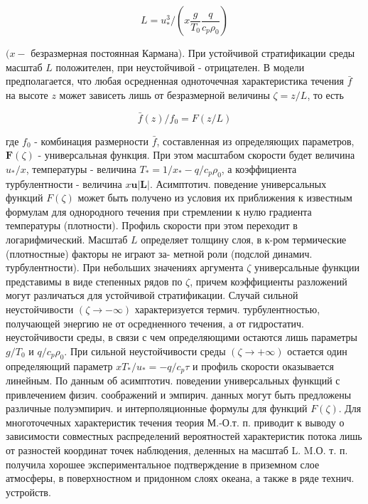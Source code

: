 \documentclass[10pt]{article}
\begin{document}
\[

L=u_{*}^{3} /\left(x \frac{g}{T_{0}} \frac{q}{c_{p} \rho_{0}}\right)

\]



$(x-$ безразмерная постоянная Кармана). При устойчивой стратификации среды масштаб $L$ положителен, при неустойчивой - отрицателен. В модели предполагается, что любая осредненная одноточечная характеристика течения $\bar{f}$ на высоте $z$ может зависеть лишь от безразмерной величины $\zeta=z / L$, то есть



\[

\bar{f}(z) / f_{0}=F(z / L)

\]



где $f_{0}$ - комбинация размерности $\bar{f}$, составленная из определяющих параметров, $\boldsymbol{F}(\zeta)$ - универсальная функция. При этом масштабом скорости будет величина $u_{*} / x$, температуры - величина $T_{*}=1 / x_{*}-q / c_{p} \rho_{0}$, а коэффициента турбулентности - величина $x \boldsymbol{u}|\boldsymbol{L}|$. Асимптотич. поведение универсальных функций $F(\zeta)$ может быть получено из условия их приближения к известным формулам для однородного течения при стремлении к нулю градиента температуры (плотности). Профиль скорости при этом переходит в логарифмический. Масштаб $L$ определяет толщину слоя, в к-ром термические (плотностные) факторы не играют за- метной роли (подслой динамич. турбулентности). При небольших значениях аргумента $\zeta$ универсальные функции представимы в виде степенных рядов по $\zeta$, причем коэффициенты разложений могут различаться для устойчивой стратификации. Случай сильной неустойчивости $(\zeta \rightarrow-\infty)$ характеризуется термич. турбулентностью, получающей энергию не от осредненного течения, а от гидростатич. неустойчивости среды, в связи с чем определяющими остаются лишь параметры $g / T_{0}$ и $q / c_{p} \rho_{0}$. При сильной неустойчивости среды $(\zeta \rightarrow+\infty)$ остается один определяющий параметр $x T_{*} / u_{*}=-q / c_{p} \tau$ и профиль скорости оказывается линейным. По данным об асимптотич. поведении универсальных функщий с привлечением физич. соображений и эмпирич. данных могут быть предложены различные полуэмпирич. и интерполяционные формулы для функций $F(\zeta)$. Для многоточечных характеристик течения теория М.-О.т. п. приводит к выводу о зависимости совместных распределений вероятностей характеристик потока лишь от разностей координат точек наблюдения, деленных на масштаб L. M.О. т. п. получила хорошее экспериментальное подтверждение в приземном слое атмосферы, в поверхностном и придонном слоях океана, а также в ряде технич. устройств.
\end{document}
